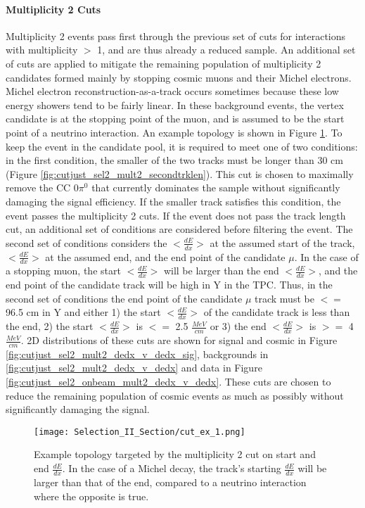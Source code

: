 \paragraph{Multiplicity 2 Cuts}
Multiplicity 2 events pass first through the previous set of cuts for interactions with multiplicity $>$ 1, and are thus already a reduced sample. An additional set of cuts are applied to mitigate the remaining population of multiplicity 2 candidates formed mainly by stopping cosmic muons and their Michel electrons. Michel electron reconstruction-as-a-track occurs sometimes because these low energy showers tend to be fairly linear.  In these background events, the vertex candidate is at the stopping point of the muon, and is assumed to be the start point of a neutrino interaction. An example topology is shown in Figure \ref{fig:cut_ex_1}. To keep the event in the candidate pool, it is required to meet one of two conditions: in the first condition, the smaller of the two tracks must be longer than 30 cm (Figure \ref{fig:cutjust_sel2_mult2_secondtrklen}). This cut is chosen to maximally remove the CC 0$\pi^0$ that currently dominates the sample without significantly damaging the signal efficiency. If the smaller track satisfies this condition, the event passes the multiplicity 2 cuts. If the event does not pass the track length cut, an additional set of conditions are considered before filtering the event.  The second set of conditions considers the $<\frac{dE}{dx}>$ at the assumed start of the track, $<\frac{dE}{dx}>$ at the assumed end, and the end point of the candidate $\mu$.  In the case of a stopping muon, the start $<\frac{dE}{dx}>$ will be larger than the end $<\frac{dE}{dx}>$, and the end point of the candidate track will be high in Y in the TPC.  Thus, in the second set of conditions the end point of the candidate $\mu$ track must be $<=$ 96.5 cm in Y and either 1) the start $<\frac{dE}{dx}>$ of the candidate track is less than the end, 2) the start $<\frac{dE}{dx}>$ is $<=$ 2.5 $\frac{MeV}{cm}$ or 3) the end $<\frac{dE}{dx}>$ is $>=$ 4 $\frac{MeV}{cm}$. 2D distributions of these cuts are shown for signal and cosmic in Figure \ref{fig:cutjust_sel2_mult2_dedx_v_dedx_sig}, backgrounds in \ref{fig:cutjust_sel2_mult2_dedx_v_dedx} and data in Figure \ref{fig:cutjust_sel2_onbeam_mult2_dedx_v_dedx}.  These cuts are chosen to reduce the remaining population of cosmic events as much as possibly without significantly damaging the signal.  

\begin{figure}[H]
  \centering
  \texttt{[image: Selection\_II\_Section/cut\_ex\_1.png]}
  \caption{Example topology targeted by the multiplicity 2 cut on start and end $\frac{dE}{dx}$.  In the case of a Michel decay, the track's starting $\frac{dE}{dx}$ will be larger than that of the end, compared to a neutrino interaction where the opposite is true. }
\label{fig:cut_ex_1}
\end{figure}


